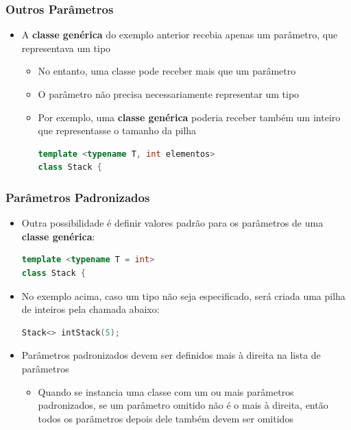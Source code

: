 \documentclass[aspectratio=169]{beamer}
\begin{document}
\begin{frame}[fragile]\frametitle{Outros Parâmetros}
\begin{itemize}
	\item A \textbf{classe genérica} do exemplo anterior recebia apenas um parâmetro, que representava um tipo
	\begin{itemize}
		\item No entanto, uma classe pode receber mais que um parâmetro
		\item O parâmetro não precisa necessariamente representar um tipo
		\item Por exemplo, uma \textbf{classe genérica} poderia receber também um inteiro que representasse o tamanho da pilha
\begin{lstlisting}[language=C++]
template <typename T, int elementos>
class Stack {
\end{lstlisting}
	\end{itemize}
\end{itemize}
\end{frame}

\begin{frame}[fragile]\frametitle{Parâmetros Padronizados}
\begin{itemize}
	\item Outra possibilidade é definir valores padrão para os parâmetros de uma \textbf{classe genérica}:
\begin{lstlisting}[language=C++]
template <typename T = int>
class Stack {
\end{lstlisting}
	\item No exemplo acima, caso um tipo não seja especificado, será criada uma pilha de inteiros pela chamada abaixo:
\begin{lstlisting}[language=C++]
Stack<> intStack(5);
\end{lstlisting}
	\item Parâmetros padronizados devem ser definidos mais à direita na lista de parâmetros
	\begin{itemize}
		\item Quando se instancia uma classe com um ou mais parâmetros padronizados, se um parâmetro omitido não é o mais à direita, então todos os parâmetros depois dele também devem ser omitidos
	\end{itemize}
\end{itemize}
\end{frame}
\end{document}
